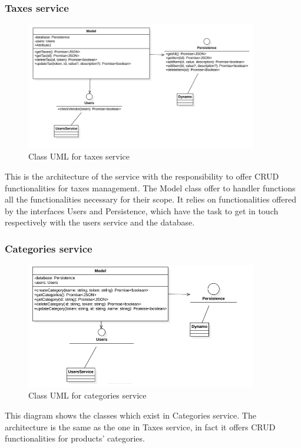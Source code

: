 \subsubsection{Taxes service}
\begin{figure}[H]
    \includegraphics[width=0.9\textwidth]{res/images/class-diagrams/taxes.png}
    \caption{Class UML for taxes service}
\end{figure}
This is the architecture of the service with the responsibility to offer CRUD functionalities for taxes management.
The Model class offer to handler functions all the functionalities necessary for their scope. It relies on functionalities
offered by the interfaces Users and Persistence, which have the task to get in touch respectively with the users service and the
database.

\subsubsection{Categories service}
\begin{figure}[H]
    \includegraphics[width=0.9\textwidth]{res/images/class-diagrams/categories.png}
    \caption{Class UML for categories service}
\end{figure}
This diagram shows the classes which exist in Categories service. The architecture is the same as the one in Taxes service,
in fact it offers CRUD functionalities for products' categories.

